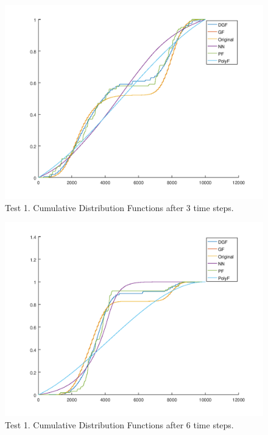 \begin{figure}
\caption{Test 1. Cumulative Distribution Functions after $3$ time steps.}
\includegraphics[width=\linewidth]{test1_03}
\end{figure}

\begin{figure}
\caption{Test 1. Cumulative Distribution Functions after $6$ time steps.}
\includegraphics[width=\linewidth]{test1_06}
\end{figure}

